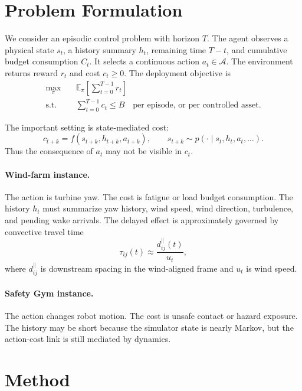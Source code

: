 \documentclass[11pt]{article}
\newcommand{\E}{\mathbb{E}}
\newcommand{\Ct}{C_t}
\begin{document}
\section{Problem Formulation}

We consider an episodic control problem with horizon $T$.
The agent observes a physical state $s_t$, a history summary $h_t$, remaining time $T-t$, and cumulative budget consumption $\Ct$.
It selects a continuous action $a_t \in \mathcal A$.
The environment returns reward $r_t$ and cost $c_t \ge 0$.
The deployment objective is
\begin{align}
  \max_\pi \quad & \E_\pi \left[\sum_{t=0}^{T-1} r_t \right] \\
  \text{s.t.} \quad & \sum_{t=0}^{T-1} c_t \le B
  \quad \text{per episode, or per controlled asset.}
\end{align}

The important setting is state-mediated cost:
\begin{equation}
  c_{t+k} = f(s_{t+k}, h_{t+k}, a_{t+k}),
  \qquad
  s_{t+k} \sim p(\cdot \mid s_t, h_t, a_t, \ldots).
\end{equation}
Thus the consequence of $a_t$ may not be visible in $c_t$.

\paragraph{Wind-farm instance.}
The action is turbine yaw.
The cost is fatigue or load budget consumption.
The history $h_t$ must summarize yaw history, wind speed, wind direction, turbulence, and pending wake arrivals.
The delayed effect is approximately governed by convective travel time
\begin{equation}
  \tau_{ij}(t) \approx \frac{d_{ij}^{\parallel}(t)}{u_t},
\end{equation}
where $d_{ij}^{\parallel}$ is downstream spacing in the wind-aligned frame and $u_t$ is wind speed.

\paragraph{Safety Gym instance.}
The action changes robot motion.
The cost is unsafe contact or hazard exposure.
The history may be short because the simulator state is nearly Markov, but the action-cost link is still mediated by dynamics.

\section{Method}
\end{document}
